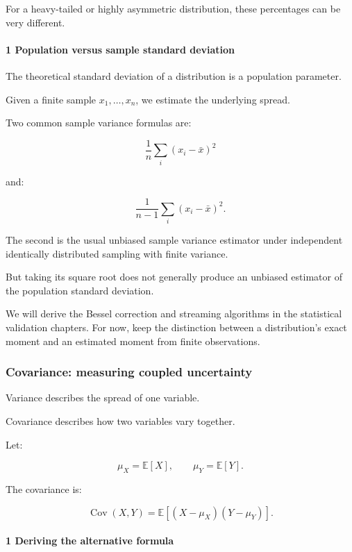 For a heavy-tailed or highly asymmetric distribution, these percentages can be very different.

\paragraph{1 Population versus sample standard deviation}\label{population-versus-sample-standard-deviation}

The theoretical standard deviation of a distribution is a population parameter.

Given a finite sample \(x_1,\ldots,x_n\), we estimate the underlying spread.

Two common sample variance formulas are:

\[
 \frac1n\sum_i(x_i-\bar x)^2
\]

and:

\[
 \frac1{n-1}\sum_i(x_i-\bar x)^2.
\]

The second is the usual unbiased sample variance estimator under independent identically distributed sampling with finite variance.

But taking its square root does not generally produce an unbiased estimator of the population standard deviation.

We will derive the Bessel correction and streaming algorithms in the statistical validation chapters. For now, keep the distinction between a distribution's exact moment and an estimated moment from finite observations.

\subsubsection{Covariance: measuring coupled uncertainty}\label{covariance-measuring-coupled-uncertainty}

Variance describes the spread of one variable.

Covariance describes how two variables vary together.

Let:

\[
 \mu_X=\mathbb E[X], \qquad \mu_Y=\mathbb E[Y].
\]

The covariance is:

\[
 \boxed{ \operatorname{Cov}(X,Y)= \mathbb E[(X-\mu_X)(Y-\mu_Y)] }.
\]

\paragraph{1 Deriving the alternative formula}\label{deriving-the-alternative-formula}

